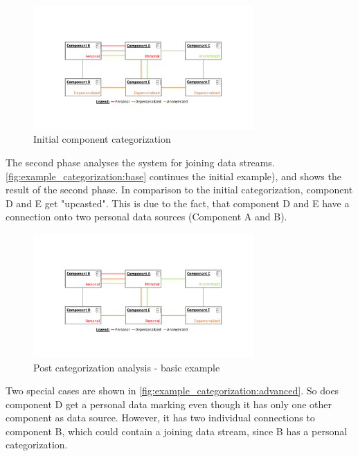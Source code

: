 \begin{figure}[h]
	\centering
	\includegraphics[trim = 35mm 40mm 40mm 45mm, clip, width=0.75\textwidth]{graphs/component_categorization_examples_initial}
	\caption{Initial component categorization}
	\label{fig:example_categorization:init}
\end{figure}

The second phase analyses the system for joining data streams. \autoref{fig:example_categorization:base} continues the initial example), and shows the result of the second phase. In comparison to the initial categorization, component D and E get "upcasted". This is due to the fact, that component D and E have a connection onto two personal data sources (Component A and B).

\begin{figure}[h]
	\centering
	\includegraphics[trim = 35mm 40mm 40mm 45mm, clip, width=0.75\textwidth]{graphs/component_categorization_examples_upcast_base}
	\caption{Post categorization analysis - basic example}
	\label{fig:example_categorization:base}
\end{figure}

Two special cases are shown in \autoref{fig:example_categorization:advanced}. So does component D get a personal data marking even though it has only one other component as data source. However, it has two individual connections to component B, which could contain a joining data stream, since B has a personal categorization.

